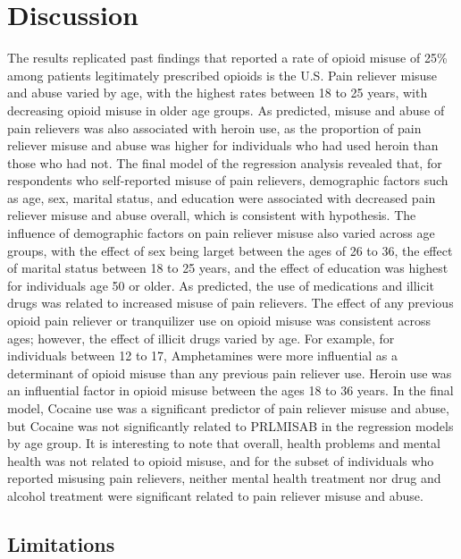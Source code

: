 \documentclass[sigconf]{acmart}
\begin{document}

\section{Discussion}

The results replicated past findings that reported a rate of opioid misuse 
of 25\% among patients legitimately prescribed opioids is the U.S. Pain reliever 
misuse and abuse varied by age, with the highest rates between 18 to 25 years, 
with decreasing opioid misuse in older age groups. As predicted, misuse and 
abuse of pain relievers was also associated with heroin use, as the proportion 
of pain reliever misuse and abuse was higher for individuals who had used heroin 
than those who had not. The final model of the regression analysis revealed that, 
for respondents who self-reported misuse of pain relievers, demographic factors 
such as age, sex, marital status, and education were associated with decreased 
pain reliever misuse and abuse overall, which is consistent with hypothesis. 
The influence of demographic factors on pain reliever misuse also varied across 
age groups, with the effect of sex being larget between the ages of 26 to 36, 
the effect of marital status between 18 to 25 years, and the effect of education 
was highest for individuals age 50 or older. As predicted, the use of medications 
and illicit drugs was related to increased misuse of pain relievers. The effect 
of any previous opioid pain reliever or tranquilizer use on opioid misuse was 
consistent across ages; however, the effect of illicit drugs varied by age. 
For example, for individuals between 12 to 17, Amphetamines were more influential 
as a determinant of opioid misuse than any previous pain reliever use. Heroin use
was an influential factor in opioid misuse between the ages 18 to 36 years. 
In the final model, Cocaine use was a significant predictor of pain reliever 
misuse and abuse, but Cocaine was not significantly related to PRLMISAB in the 
regression models by age group. It is interesting to note that overall, health
problems and mental health was not related to opioid misuse, and for the subset 
of individuals who reported misusing pain relievers, neither mental health 
treatment nor drug and alcohol treatment were significant related to pain 
reliever misuse and abuse. 

\subsection{Limitations}
\end{document}
